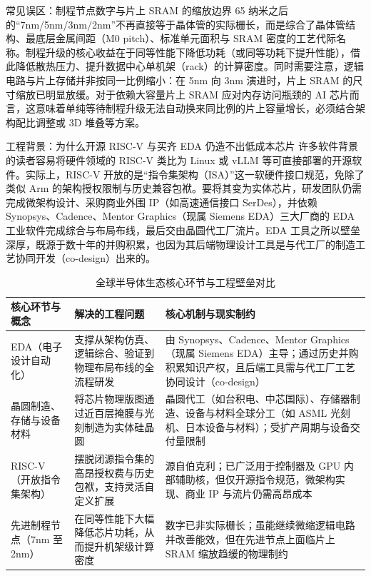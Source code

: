 \documentclass[UTF8,a4paper,11pt,fontset=fandol]{ctexart}
\begin{document}
\begin{warningbox}{常见误区：制程节点数字与片上 SRAM 的缩放边界}
65 纳米之后的“7nm/5nm/3nm/2nm”不再直接等于晶体管的实际栅长，而是综合了晶体管结构、最底层金属间距（M0 pitch）、标准单元面积与 SRAM 密度的工艺代际名称。制程升级的核心收益在于同等性能下降低功耗（或同等功耗下提升性能），借此降低散热压力、提升数据中心单机架（rack）的计算密度。同时需要注意，逻辑电路与片上存储并非按同一比例缩小：在 5nm 向 3nm 演进时，片上 SRAM 的尺寸缩放已明显放缓。对于依赖大容量片上 SRAM 应对内存访问瓶颈的 AI 芯片而言，这意味着单纯等待制程升级无法自动换来同比例的片上容量增长，必须结合架构配比调整或 3D 堆叠等方案。
\end{warningbox}
\begin{knowledgebox}{工程背景：为什么开源 RISC-V 与买齐 EDA 仍造不出低成本芯片}
许多软件背景的读者容易将硬件领域的 RISC-V 类比为 Linux 或 vLLM 等可直接部署的开源软件。实际上，RISC-V 开放的是“指令集架构（ISA）”这一软硬件接口规范，免除了类似 Arm 的架构授权限制与历史兼容包袱。要将其变为实体芯片，研发团队仍需完成微架构设计、采购商业外围 IP（如高速通信接口 SerDes），并依赖 Synopsys、Cadence、Mentor Graphics（现属 Siemens EDA）三大厂商的 EDA 工业软件完成综合与布局布线，最后交由晶圆代工厂流片。EDA 工具之所以壁垒深厚，既源于数十年的并购积累，也因为其后端物理设计工具是与代工厂的制造工艺协同开发（co-design）出来的。
\end{knowledgebox}
\begin{table}[H]\centering\small
\caption{全球半导体生态核心环节与工程壁垒对比}
\begin{tabular}{>{\raggedright\arraybackslash}p{\dimexpr(\linewidth-6\tabcolsep)/3\relax}>{\raggedright\arraybackslash}p{\dimexpr(\linewidth-6\tabcolsep)/3\relax}>{\raggedright\arraybackslash}p{\dimexpr(\linewidth-6\tabcolsep)/3\relax}}
\toprule
核心环节与概念 & 解决的工程问题 & 核心机制与现实制约\\\midrule
EDA（电子设计自动化） & 支撑从架构仿真、逻辑综合、验证到物理布局布线的全流程研发 & 由 Synopsys、Cadence、Mentor Graphics（现属 Siemens EDA）主导；通过历史并购积累知识产权，且后端工具需与代工厂工艺协同设计（co-design）\\[4pt]
晶圆制造、存储与设备材料 & 将芯片物理版图通过近百层掩膜与光刻制造为实体硅晶圆 & 晶圆代工（如台积电、中芯国际）、存储器制造、设备与材料全球分工（如 ASML 光刻机、日本设备与材料）；受扩产周期与设备交付量限制\\[4pt]
RISC-V（开放指令集架构） & 摆脱闭源指令集的高昂授权费与历史包袱，支持灵活自定义扩展 & 源自伯克利；已广泛用于控制器及 GPU 内部辅助核，但仅开源指令规范，微架构实现、商业 IP 与流片仍需高昂成本\\[4pt]
先进制程节点（7nm 至 2nm） & 在同等性能下大幅降低芯片功耗，从而提升机架级计算密度 & 数字已非实际栅长；虽能继续微缩逻辑电路并改善能效，但在先进节点上面临片上 SRAM 缩放趋缓的物理制约\\[4pt]
\bottomrule\end{tabular}\end{table}
\end{document}
